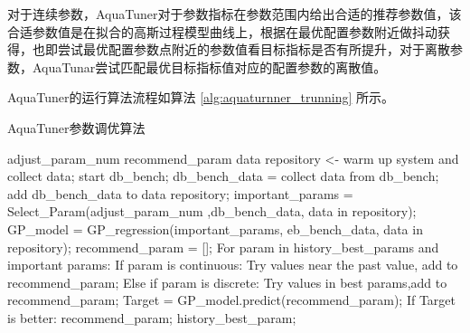 对于连续参数，AquaTuner对于参数指标在参数范围内给出合适的推荐参数值，该合适参数值是在拟合的高斯过程模型曲线上，根据在最优配置参数附近做抖动获得，也即尝试最优配置参数点附近的参数值看目标指标是否有所提升，对于离散参数，AquaTunar尝试匹配最优目标指标值对应的配置参数的离散值。

AquaTuner的运行算法流程如算法 \ref{alg:aquaturnner_trunning} 所示。

\begin{algorithm}[htb]
  \caption{ AquaTuner参数调优算法 }
  \label{alg:aquaturnner_trunning}
  \begin{algorithmic}[2]
    \Require
      adjust\_param\_num
    \Ensure
      recommend\_param
    \State data repository <- warm up system and collect data;
    \State start db\_bench;
    \State db\_bench\_data = collect data from db\_bench;
    \State add db\_bench\_data to data repository;
    \State important\_params = Select\_Param(adjust\_param\_num ,db\_bench\_data, data in repository);
    \State GP\_model = GP\_regression(important\_params, eb\_bench\_data, data in repository);
    \State recommend\_param = [];
    \State For param in  history\_best\_params and important params:
    \State \qquad If param is continuous:
    \State \qquad \qquad Try values near the past value, add to recommend\_param;
    \State \qquad Else if param is discrete:
    \State \qquad \qquad Try values in best params,add to recommend\_param;
    \State Target = GP\_model.predict(recommend\_param);
    \State If Target is better:
    \State \qquad \Return recommend\_param;
    \State \Return history\_best\_param;
  \end{algorithmic}
\end{algorithm}
